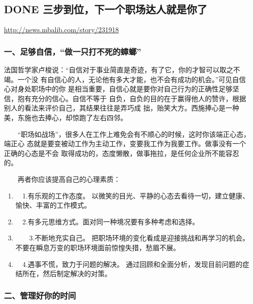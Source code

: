 \documentclass[11pt]{ctexart}
\begin{document}
\subsection{{\bfseries\sffamily DONE} 三步到位，下一个职场达人就是你了}
\label{sec:orgheadline51}
\url{http://news.mbalib.com/story/231918}

\subsubsection{一、足够自信，“做一只打不死的蟑螂”}
\label{sec:orgheadline37}

法国哲学家卢梭说：“自信对于事业简直是奇迹，有了它，你的才智可以取之不竭。一个没
有自信心的人，无论他有多大才能，也不会有成功的机会。”可见自信心对身处职场中的你
是相当重要，自信心就是要你对自己行为的正确性足够坚信，抱有充分的信心。自信不等于
自负，自负的目的在于赢得他人的赞许，根据别人的看法来评价自己，其结果往往是弄巧成
拙，贻笑大方。西施捧心是一种美，东施也去捧心，却惊跑了左右四邻。

　　“职场如战场”，很多人在工作上难免会有不顺心的时候，这时你该端正心态，端正心
态就是要变被动工作为主动工作，变要我工作为我要工作。做事没有一个正确的心态是不会
取得成功的，态度懒散，做事拖拉，是任何企业所不能容忍的。

　　再者你应该提高自己的心理素质：
\begin{enumerate}
\item 　1.有乐观的工作态度。
\label{sec:orgheadline33}
以微笑的目光、平静的心态去看待一切，建立健康、愉快、丰富的工作模式。

\item 　2.有多元思维方式。面对同一种境况要有多种考虑和选择。
\label{sec:orgheadline34}

\item 　　3.不断地充实自己。
\label{sec:orgheadline35}
把职场环境的变化看成是迎接挑战和再学习的机会。不要在瞬息万变的职场环境面前惊惶失措，愁眉不展。

\item 　4.遇事不慌，致力于问题的解决。
\label{sec:orgheadline36}
通过回顾和全面分析，发现目前问题的症结所在，然后制定解决的对策。
\end{enumerate}

\subsubsection{二、管理好你的时间}
\label{sec:orgheadline49}
\end{document}
